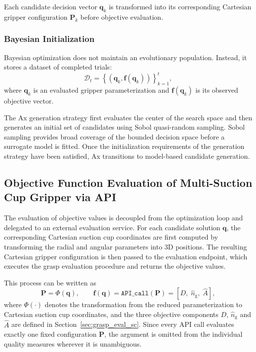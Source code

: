 Each candidate decision vector $\mathbf{q}_k$ is transformed into its corresponding Cartesian
gripper configuration $\mathbf{P}_k$ before objective evaluation.

\subsubsection{Bayesian Initialization}

Bayesian optimization does not maintain an evolutionary population. Instead, it stores a dataset of
completed trials:
\begin{equation}
    \mathcal{D}_t =
    \left\{
        \left(\mathbf{q}_k,\mathbf{f}(\mathbf{q}_k)\right)
    \right\}_{k=1}^{t},
\end{equation}
where $\mathbf{q}_k$ is an evaluated gripper parameterization and $\mathbf{f}(\mathbf{q}_k)$ is its
observed objective vector.

The Ax generation strategy first evaluates the center of the search space and then generates an
initial set of candidates using Sobol quasi-random sampling. Sobol sampling provides broad coverage
of the bounded decision space before a surrogate model is fitted. Once the initialization
requirements of the generation strategy have been satisfied, Ax transitions to model-based candidate
generation.

\subsection{Objective Function Evaluation of Multi-Suction Cup Gripper via API}

The evaluation of objective values is decoupled from the optimization loop and delegated to an
external evaluation service. For each candidate solution $\mathbf{q}$, the corresponding Cartesian
suction cup coordinates are first computed by transforming the radial and angular parameters into 3D
positions. The resulting Cartesian gripper configuration is then passed to the evaluation endpoint,
which executes the grasp evaluation procedure and returns the objective values.

This process can be written as
\begin{equation}
    \mathbf{P} = \Phi(\mathbf{q}),
    \qquad
    \mathbf{f}(\mathbf{q})
    =
    \texttt{API\_call}(\mathbf{P})
    =
    \left[D,\;\hat{n}_{\mathrm{g}},\;\hat{A}\right],
\end{equation}
where $\Phi(\cdot)$ denotes the transformation from the reduced parameterization to Cartesian
suction cup coordinates, and the three objective components $D$, $\hat{n}_{\mathrm{g}}$ and
$\hat{A}$ are defined in Section~\ref{sec:grasp_eval_sc}. Since every API call evaluates exactly one
fixed configuration $\mathbf{P}$, the argument is omitted from the individual quality measures
wherever it is unambiguous.


